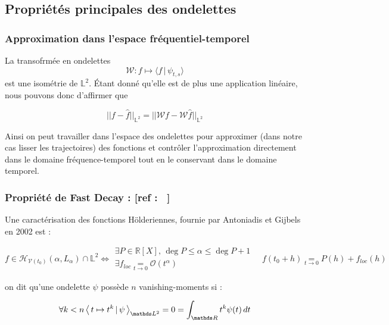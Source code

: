\subsection{Propriétés principales des ondelettes}

\smallskip


\subsubsection{Approximation dans l'espace fréquentiel-temporel}

La transofrmée en ondelettes
\begin{equation*}
	\mathcal W : f \mapsto \langle f \, | \, \psi_{t,s} \rangle
\end{equation*}
est une isométrie de $\mathds L^2$. Étant donné qu'elle est de plus une application linéaire, nous pouvons donc d'affirmer que

\begin{equation*}
	\boxed{|| f - \hat f ||_{\mathds L^2} = || \mathcal W f - \mathcal W \hat f ||_{\mathds L^2}}
\end{equation*}

Ainsi on peut travailler dans l'espace des ondelettes pour approximer (dans notre cas lisser les trajectoires) des fonctions et contrôler l'approximation directement dans le domaine fréquence-temporel tout en le conservant dans le domaine temporel.

\subsubsection{Propriété de Fast Decay : [ref : ~\cite{mallat-wavelet-course-ens-wavelet-zoom}]}

Une caractérisation des fonctions Hölderiennes, fournie par Antoniadis et Gijbels en 2002 est :

\begin{equation*}
	f \in \mathcal H_{\mathcal V(t_0)}(\alpha, L_\alpha) \cap \mathds L^2 \iff
	\begin{array}{l}
		\exists P \in \mathds R[X], \, \deg P \leq \alpha \leq \deg P + 1
		\\
		\exists f_{loc} \underset{t \rightarrow 0}{=} \mathcal O(t^\alpha)
	\end{array}
	\quad f(t_0 + h) \underset{t \rightarrow 0}{=} P(h) + f_{loc}(h)
\end{equation*}

\begin{definition}
	on dit qu'une ondelette $\psi$ possède $n$ vanishing-moments si :

	\begin{equation*}
		\forall k < n \prodscalselon{t \mapsto t^k}{\psi}{\mathds L^2} = 0 = \int_{\mathds R} t^k \psi(t) \, dt
	\end{equation*}

\end{definition}

